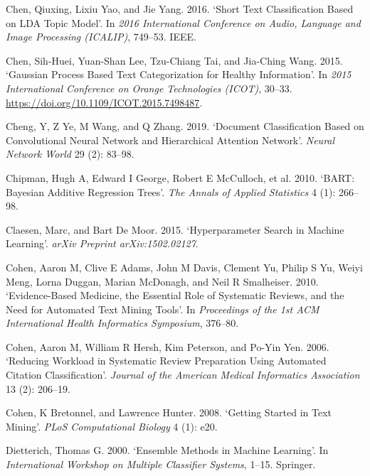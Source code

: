 \documentclass{article}
\newlength{\cslhangindent}
\newenvironment{CSLReferences}[2] %
 {%
  \setlength{\parindent}{0pt}
  \ifodd #1 \everypar{\setlength{\hangindent}{\cslhangindent}}\ignorespaces\fi
  \ifnum #2 > 0
  \setlength{\parskip}{#2\baselineskip}
  \fi
 }%
 {}
\begin{document}
\begin{CSLReferences}{1}{0}
\leavevmode{}%
Chen, Qiuxing, Lixiu Yao, and Jie Yang. 2016. {`Short Text
Classification Based on LDA Topic Model'}. In \emph{2016 International
Conference on Audio, Language and Image Processing (ICALIP)}, 749--53.
IEEE.

\leavevmode{}%
Chen, Sih-Huei, Yuan-Shan Lee, Tzu-Chiang Tai, and Jia-Ching Wang. 2015.
{`Gaussian Process Based Text Categorization for Healthy Information'}.
In \emph{2015 International Conference on Orange Technologies (ICOT)},
30--33. \url{https://doi.org/10.1109/ICOT.2015.7498487}.

\leavevmode{}%
Cheng, Y, Z Ye, M Wang, and Q Zhang. 2019. {`Document Classification
Based on Convolutional Neural Network and Hierarchical Attention
Network'}. \emph{Neural Network World} 29 (2): 83--98.

\leavevmode{}%
Chipman, Hugh A, Edward I George, Robert E McCulloch, et al. 2010.
{`BART: Bayesian Additive Regression Trees'}. \emph{The Annals of
Applied Statistics} 4 (1): 266--98.

\leavevmode{}%
Claesen, Marc, and Bart De Moor. 2015. {`Hyperparameter Search in
Machine Learning'}. \emph{arXiv Preprint arXiv:1502.02127}.

\leavevmode{}%
Cohen, Aaron M, Clive E Adams, John M Davis, Clement Yu, Philip S Yu,
Weiyi Meng, Lorna Duggan, Marian McDonagh, and Neil R Smalheiser. 2010.
{`Evidence-Based Medicine, the Essential Role of Systematic Reviews, and
the Need for Automated Text Mining Tools'}. In \emph{Proceedings of the
1st ACM International Health Informatics Symposium}, 376--80.

\leavevmode{}%
Cohen, Aaron M, William R Hersh, Kim Peterson, and Po-Yin Yen. 2006.
{`Reducing Workload in Systematic Review Preparation Using Automated
Citation Classification'}. \emph{Journal of the American Medical
Informatics Association} 13 (2): 206--19.

\leavevmode{}%
Cohen, K Bretonnel, and Lawrence Hunter. 2008. {`Getting Started in Text
Mining'}. \emph{PLoS Computational Biology} 4 (1): e20.

\leavevmode{}%
Dietterich, Thomas G. 2000. {`Ensemble Methods in Machine Learning'}. In
\emph{International Workshop on Multiple Classifier Systems}, 1--15.
Springer.


\end{CSLReferences}
\end{document}

